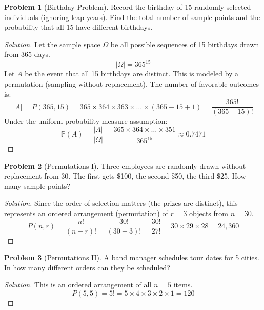 \documentclass[11pt, letterpaper]{article}
\theoremstyle{definition}
\newtheorem{example}{Problem}
\theoremstyle{remark}
\newcommand{\Prob}{\mathbb{P}}
\begin{document}
\begin{example}[Birthday Problem]
    Record the birthday of 15 randomly selected individuals (ignoring leap years). Find the total number of sample points and the probability that all 15 have different birthdays.
\end{example}
\begin{proof}[Solution]
    Let the sample space $\Omega$ be all possible sequences of 15 birthdays drawn from 365 days.
    \[ |\Omega| = 365^{15} \]
    Let $A$ be the event that all 15 birthdays are distinct. This is modeled by a permutation (sampling without replacement). The number of favorable outcomes is:
    \[ |A| = P(365, 15) = 365 \times 364 \times 363 \times \dots \times (365 - 15 + 1) = \frac{365!}{(365-15)!} \]
    Under the uniform probability measure assumption:
    \[ \Prob(A) = \frac{|A|}{|\Omega|} = \frac{365 \times 364 \times \dots \times 351}{365^{15}} \approx 0.7471 \]
\end{proof}

\begin{example}[Permutations I]
    Three employees are randomly drawn without replacement from 30. The first gets \$100, the second \$50, the third \$25. How many sample points?
\end{example}
\begin{proof}[Solution]
    Since the order of selection matters (the prizes are distinct), this represents an ordered arrangement (permutation) of $r=3$ objects from $n=30$.
    \[ P(n, r) = \frac{n!}{(n-r)!} = \frac{30!}{(30-3)!} = \frac{30!}{27!} = 30 \times 29 \times 28 = 24,360 \]
\end{proof}

\begin{example}[Permutations II]
    A band manager schedules tour dates for 5 cities. In how many different orders can they be scheduled?
\end{example}
\begin{proof}[Solution]
    This is an ordered arrangement of all $n=5$ items.
    \[ P(5, 5) = 5! = 5 \times 4 \times 3 \times 2 \times 1 = 120 \]
\end{proof}
\end{document}
